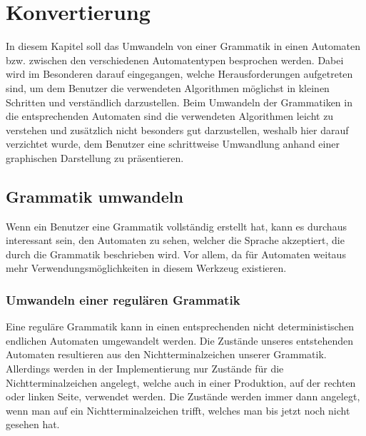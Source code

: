 

\chapter{Konvertierung}\label{ConverTo}

In diesem Kapitel soll das Umwandeln von einer Grammatik in einen Automaten
bzw. zwischen den verschiedenen Automatentypen besprochen werden. Dabei wird
im Besonderen darauf eingegangen, welche Herausforderungen aufgetreten sind, um
dem Benutzer die verwendeten Algorithmen möglichst in kleinen Schritten und
verständlich darzustellen. Beim Umwandeln der Grammatiken in die entsprechenden
Automaten sind die verwendeten Algorithmen leicht zu verstehen und zusätzlich
nicht besonders gut darzustellen, weshalb hier darauf verzichtet wurde, dem
Benutzer eine schrittweise Umwandlung anhand einer graphischen Darstellung zu
präsentieren.\vspace{10pt}


\section{Grammatik umwandeln}\label{ConverToGrammar}

Wenn ein Benutzer eine Grammatik vollständig erstellt hat, kann es durchaus
interessant sein, den Automaten zu sehen, welcher die Sprache akzeptiert, die
durch die Grammatik beschrieben wird. Vor allem, da für Automaten weitaus mehr
Verwendungsmöglichkeiten in diesem Werkzeug existieren.\vspace{10pt}

\subsection{Umwandeln einer regulären Grammatik}\label{ConverToGrammarRegular}

Eine reguläre Grammatik kann in einen entsprechenden nicht deterministischen
endlichen Automaten umgewandelt werden. Die Zustände unseres entstehenden
Automaten resultieren aus den Nichtterminalzeichen unserer Grammatik. Allerdings
werden in der Implementierung nur Zustände für die Nichtterminalzeichen angelegt,
welche auch in einer Produktion, auf der rechten oder linken Seite, verwendet
werden. Die Zustände werden immer dann angelegt, wenn man auf ein
Nichtterminalzeichen trifft, welches man bis jetzt noch nicht gesehen
hat.\vspace{10pt}

